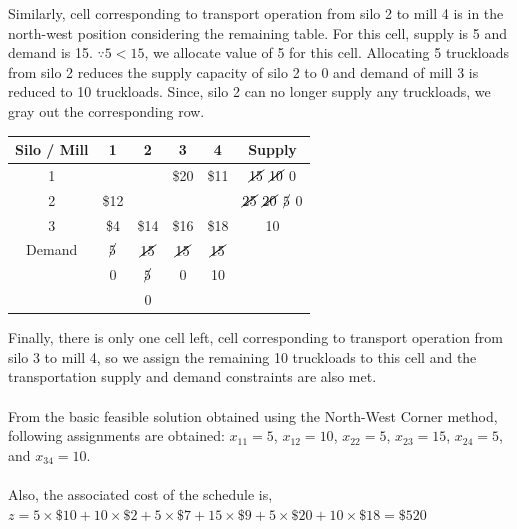 Similarly, cell corresponding to transport operation from silo 2 to mill 4 is in the north-west position considering the remaining table.  For this cell, supply is 5 and demand is 15. $\because 5 < 15$, we allocate value of 5 for this cell. Allocating 5 truckloads from silo 2 reduces the supply capacity of silo 2 to 0 and demand of mill 3 is reduced to 10 truckloads. Since, silo 2 can no longer supply any truckloads, we gray out the corresponding row.
\begin{center}
	\begin{tabular}{c | c | c | c | c | c}
		Silo / Mill & 1 & 2 & 3 & 4 & \textbf{Supply}\\ 
		\hline
		1 & \innerbox{\$10}{5} \cellcolor[gray]{0.8} & \innerbox{\$2}{10} \cellcolor[gray]{0.8} & \$20 \cellcolor[gray]{0.8} & \$11 \cellcolor[gray]{0.8} & $ \cancel{15} $ $ \cancel{10} $ 0\\
		\hline
		2 & \$12 \cellcolor[gray]{0.8} & \innerbox{\$7}{5} \cellcolor[gray]{0.8} & \innerbox{\$9}{15} \cellcolor[gray]{0.8} & \innerbox{\$20}{5} \cellcolor[gray]{0.8} & $ \cancel{25} $ $ \cancel{20} $ $ \cancel{5} $ 0\\
		\hline
		3 & \$4 \cellcolor[gray]{0.8} & \$14 \cellcolor[gray]{0.8} & \$16 \cellcolor[gray]{0.8} & \$18 & 10\\
		\hline
		Demand & $ \cancel{5} $ & $ \cancel{15} $ & $ \cancel{15} $ & $ \cancel{15} $ & \\
		& 0 & $ \cancel{5}$ & 0 & 10 & \\ 
		&  & 0 & & & \\
	\end{tabular}
\end{center}
Finally, there is only one cell left, cell corresponding to transport operation from silo 3 to mill 4, so we assign the remaining 10 truckloads to this cell and the transportation supply and demand constraints are also met.\\\\
From the basic feasible solution obtained using the North-West Corner method, following assignments are obtained: $ x_{11} = 5$, $ x_{12} = 10$, $ x_{22} = 5$, $ x_{23} = 15$, $ x_{24} = 5$, and $ x_{34} = 10$.\\\\
Also, the associated cost of the schedule is,\\
$ z = 5 \times \$10 + 10 \times \$2 + 5 \times \$7 + 15 \times \$9 + 5 \times \$20 + 10 \times \$18 = \$520$
